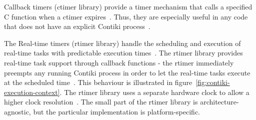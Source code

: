 Callback timers (ctimer library) provide a timer mechanism that calls a specified
C function when a ctimer expires~\cite{contiki-docs}.
Thus, they are especially useful in any code that does not have an
explicit Contiki process~\cite{contiki-wiki-timers}.

The Real-time timers (rtimer library) handle the scheduling and execution of
real-time tasks with predictable execution times~\cite{contiki-docs}.
The rtimer library provides real-time task support through callback functions -
the rtimer immediately preempts any running Contiki process in order to let the real-time tasks
execute at the scheduled time~\cite{contiki-wiki-timers}.
This behaviour is illustrated in figure~\ref{fig:contiki-execution-context}.
The rtimer library uses a separate hardware clock
to allow a higher clock resolution~\cite{contiki-wiki-timers}.
The small part of the rtimer library is architecture-agnostic,
but the particular implementation is platform-specific.
